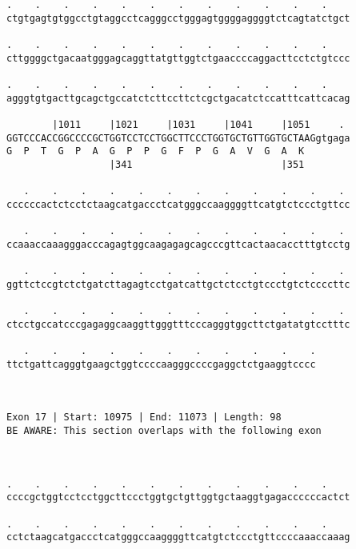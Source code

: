 \documentclass{article}
\begin{document}
\begin{Verbatim}
.    .    .    .    .    .    .    .    .    .    .    .    
ctgtgagtgtggcctgtaggcctcagggcctgggagtggggaggggtctcagtatctgct
                                                            
.    .    .    .    .    .    .    .    .    .    .    .    
cttggggctgacaatgggagcaggttatgttggtctgaaccccaggacttcctctgtccc
                                                            
.    .    .    .    .    .    .    .    .    .    .    .    
agggtgtgacttgcagctgccatctcttccttctcgctgacatctccatttcattcacag
                                                            
        |1011     |1021     |1031     |1041     |1051     . 
GGTCCCACCGGCCCCGCTGGTCCTCCTGGCTTCCCTGGTGCTGTTGGTGCTAAGgtgaga
G  P  T  G  P  A  G  P  P  G  F  P  G  A  V  G  A  K        
                  |341                          |351        
  
   .    .    .    .    .    .    .    .    .    .    .    . 
ccccccactctcctctaagcatgaccctcatgggccaaggggttcatgtctccctgttcc
                                                            
   .    .    .    .    .    .    .    .    .    .    .    . 
ccaaaccaaagggacccagagtggcaagagagcagcccgttcactaacacctttgtcctg
                                                            
   .    .    .    .    .    .    .    .    .    .    .    . 
ggttctccgtctctgatcttagagtcctgatcattgctctcctgtccctgtctccccttc
                                                            
   .    .    .    .    .    .    .    .    .    .    .    . 
ctcctgccatcccgagaggcaaggttgggtttcccagggtggcttctgatatgtcctttc
                                                            
   .    .    .    .    .    .    .    .    .    .    .
ttctgattcagggtgaagctggtccccaagggccccgaggctctgaaggtcccc
                                                      
                                                      
 
Exon 17 | Start: 10975 | End: 11073 | Length: 98
BE AWARE: This section overlaps with the following exon



.    .    .    .    .    .    .    .    .    .    .    .    
ccccgctggtcctcctggcttccctggtgctgttggtgctaaggtgagaccccccactct
                                                            
.    .    .    .    .    .    .    .    .    .    .    .    
cctctaagcatgaccctcatgggccaaggggttcatgtctccctgttccccaaaccaaag
                                                            

\end{Verbatim}
\end{document}
